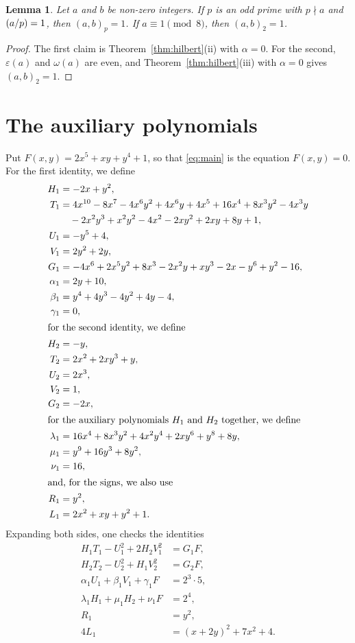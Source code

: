 \documentclass[11pt]{article}
\newtheorem{lemma}[theorem]{Lemma}
\newcommand{\leg}[2]{\mathchoice{\biggl(\dfrac{#1}{#2}\biggr)}{(#1/#2)}{(#1/#2)}{(#1/#2)}}
\begin{document}
\begin{lemma}\label{lem:square}
Let $a$ and $b$ be non-zero integers. If $p$ is an odd prime with $p\nmid a$ and $\leg{a}{p}=1$, then $(a,b)_p=1$. If $a\equiv1\pmod8$, then $(a,b)_2=1$.
\end{lemma}

\begin{proof}
The first claim is Theorem~\ref{thm:hilbert}(ii) with $\alpha=0$. For the second, $\varepsilon(a)$ and $\omega(a)$ are even, and Theorem~\ref{thm:hilbert}(iii) with $\alpha=0$ gives $(a,b)_2=1$.
\end{proof}

\section{The auxiliary polynomials}

Put $F(x,y)=2x^{5}+xy+y^{4}+1$, so that \eqref{eq:main} is the equation $F(x,y)=0$. For the first identity, we define
\begin{align*}
H_{1}&=-2x+y^{2},\\
T_{1}&=4x^{10}-8x^{7}-4x^{6}y^{2}+4x^{6}y+4x^{5}+16x^{4}+8x^{3}y^{2}-4x^{3}y\\
&\quad-2x^{2}y^{3}+x^{2}y^{2}-4x^{2}-2xy^{2}+2xy+8y+1,\\
U_{1}&=-y^{5}+4,\\
V_{1}&=2y^{2}+2y,\\
G_{1}&=-4x^{6}+2x^{5}y^{2}+8x^{3}-2x^{2}y+xy^{3}-2x-y^{6}+y^{2}-16,\\
\alpha_{1}&=2y+10,\\
\beta_{1}&=y^{4}+4y^{3}-4y^{2}+4y-4,\\
\gamma_{1}&=0,\\
\intertext{for the second identity, we define}
H_{2}&=-y,\\
T_{2}&=2x^{2}+2xy^{3}+y,\\
U_{2}&=2x^{3},\\
V_{2}&=1,\\
G_{2}&=-2x,\\
\intertext{for the auxiliary polynomials $H_{1}$ and $H_{2}$ together, we define}
\lambda_{1}&=16x^{4}+8x^{3}y^{2}+4x^{2}y^{4}+2xy^{6}+y^{8}+8y,\\
\mu_{1}&=y^{9}+16y^{3}+8y^{2},\\
\nu_{1}&=16,\\
\intertext{and, for the signs, we also use}
R_{1}&=y^{2},\\
L_{1}&=2x^{2}+xy+y^{2}+1.
\end{align*}
Expanding both sides, one checks the identities
\begin{align}
H_{1}T_{1}-U_{1}^2+2H_{2}V_{1}^2&=G_{1}F,\label{eq:norm1}\\
H_{2}T_{2}-U_{2}^2+H_{1}V_{2}^2&=G_{2}F,\label{eq:norm2}\\
\alpha_{1}U_{1}+\beta_{1}V_{1}+\gamma_{1}F&=2^{3}\cdot 5,\label{eq:bez1}\\
\lambda_{1}H_{1}+\mu_{1}H_{2}+\nu_{1}F&=2^{4},\label{eq:cross1}\\
R_{1}&=y^2,\label{eq:sign1}\\
4L_{1}&=(x+2y)^2+7x^2+4.\label{eq:sign1b}
\end{align}
\end{document}
